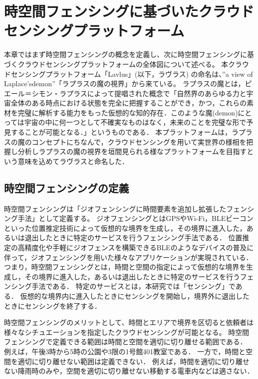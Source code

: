 \chapter{時空間フェンシングに基づいたクラウドセンシングプラットフォーム}
\thispagestyle{myheadings}
本章ではまず時空間フェンシングの概念を定義し、次に時空間フェンシングに基づくクラウドセンシングプラットフォームの全体図について述べる。
本クラウドセンシングプラットフォーム「Lavlus」(以下，ラヴラス) の命名は、”a view of Laplace’sdemon”「ラプラスの魔の視界」から来ている。
ラプラスの魔とは，ピエール＝シモン・ラプラスによって提唱された概念で「自然界のあらゆる力と宇宙全体のある時点における状態を完全に把握することができ，かつ，これらの素材を完璧に解析する能力をもった仮想的な知的存在．このような魔(demon)にとっては宇宙の中に何一つとして不確実なものはなく，未来のことを完璧な形で予見することが可能となる．」\cite{ziten}というものである．
本プラットフォームは，ラプラスの魔のコンセプトにちなんで，クラウドセンシングを用いて実世界の様相を把握し分析しラプラスの魔の視界を垣間見られる様なプラットフォームを目指すという意味を込めてラヴラスと命名した．

\section{時空間フェンシングの定義}
\label{STF}
時空間フェンシングは「ジオフェンシングに時間要素を追加し拡張したフェンシング手法」として定義する。
ジオフェンシングとはGPSやWi-Fi，BLEビーコンといった位置推定技術によって仮想的な境界を生成し，その境界に進入した，あるいは退出したときに特定のサービスを行うフェンシング手法である．
位置推定の高精度化や手軽にジオフェンスを構築できるBLEのようなデバイスの普及に伴って，ジオフェンシングを用いた様々なアプリケーションが実現されている．
つまり，時空間フェンシングとは，時間と空間の指定によって仮想的な境界を生成し，その境界に進入した，あるいは退出したときに特定のサービスを行うフェンシング手法である．
特定のサービスとは，本研究では「センシング」である．
仮想的な境界内に進入したときにセンシングを開始し，境界外に退出したときにセンシングを終了する．

時空間フェンシングのメリットとして、時間とエリアで境界を区切ると依頼者は様々なシチュエーションを指定したクラウドセンシングが可能となる。
時空間フェンシングで定義できる範囲は時間と空間を適切に切り離せる範囲である．
例えば，午後3時から5時の公園や3限の1号館401教室である．
一方で，時間と空間を適切に切り離せない範囲は定義できない．
例えば，時間を適切に切り離せない降雨時のみや，空間を適切に切り離せない移動する電車内などは適さない．

